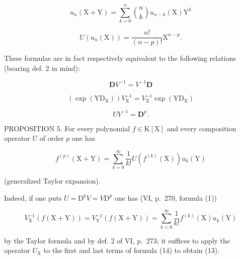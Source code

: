 \[
u _ {n} (\mathrm{X} + \mathrm{Y}) = \sum_ {k = 0} ^ {n} {\binom {n} {k}} u _ {n - k} (\mathrm{X})   \mathrm{Y} ^ {k}\tag{8}
\]

\[
U \left(u _ {n} (\mathrm{X})\right) = \frac {n !}{(n - p) !} \mathrm{X} ^ {n - p}.\tag{9}
\]

These formulae are in fact respectively equivalent to the following relations (bearing def. 2 in mind):

\[
\mathbf {D} V ^ {- 1} = V ^ {- 1} \mathbf {D}\tag{10}
\]

\[
\left(\exp \left(\mathrm{YD} _ {\mathrm{X}}\right)\right) V _ {\mathrm{X}} ^ {- 1} = V _ {\mathrm{X}} ^ {- 1} \exp \left(\mathrm{YD} _ {\mathrm{X}}\right)\tag{11}
\]

\[
U V ^ {- 1} = \mathbf {D} ^ {p}.\tag{12}
\]

PROPOSITION 5. For every polynomial \(f \in \mathrm{K}[\mathrm{X}]\) and every composition operator \(U\) of order \(p\) one has

\[
f ^ {(p)} (\mathrm{X} + \mathrm{Y}) = \sum_ {k = 0} ^ {\infty} \frac {1}{k !} U (f ^ {(k)} (\mathrm{X})) u _ {k} (\mathrm{Y})\tag{13}
\]

(generalized Taylor expansion).

Indeed, if one puts \(U = \mathrm{D}^p V = V\mathrm{D}^p\) one has (VI, p.~270, formula (1))

\[
V _ {\mathrm{X}} ^ {- 1} (f (\mathrm{X} + \mathrm{Y})) = V _ {\mathrm{Y}} ^ {- 1} (f (\mathrm{X} + \mathrm{Y})) = \sum_ {k = 0} ^ {\infty} \frac {1}{k !} f ^ {(k)} (\mathrm{X}) u _ {k} (\mathrm{Y})\tag{14}
\]

by the Taylor formula and by def. 2 of VI, p.~273; it suffices to apply the operator \(U_{\mathrm{X}}\) to the first and last terms of formula (14) to obtain (13).

